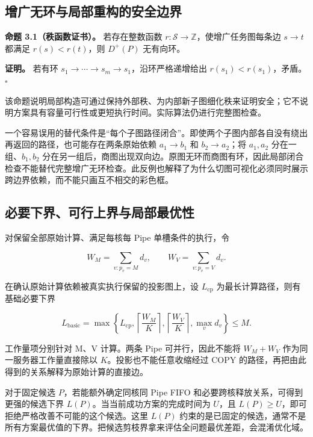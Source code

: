 \documentclass[anonymous,notoc]{gmcm2026}
\begin{document}
\subsection{增广无环与局部重构的安全边界}\label{ux589eux5e7fux65e0ux73afux4e0eux5c40ux90e8ux91cdux6784ux7684ux5b89ux5168ux8fb9ux754c}

\textbf{命题 3.1（秩函数证书）。} 若存在整数函数 \(r:\mathcal S\to\mathbb Z\)，使增广任务图每条边 \(s\to t\) 都满足 \(r(s)<r(t)\)，则 \(D^+(P)\) 无有向环。

\textbf{证明。} 若有环 \(s_1\to\cdots\to s_m\to s_1\)，沿环严格递增给出 \(r(s_1)<r(s_1)\)，矛盾。\(\square\)

该命题说明局部构造可通过保持外部秩、为内部新子图细化秩来证明安全；它不说明方案具有容量可行性或更短执行时间。实际算法仍进行完整图检查。

一个容易误用的替代条件是``每个子图路径闭合''。即使两个子图内部各自没有绕出再返回的路径，也可能存在两条原始依赖 \(a_1\to b_1\) 和 \(b_2\to a_2\)；将 \(a_1,a_2\) 分在一组、\(b_1,b_2\) 分在另一组后，商图出现双向边。原图无环而商图有环，因此局部闭合检查不能替代完整增广无环检查。此反例也解释了为什么切图可视化必须同时展示跨边界依赖，而不能只画互不相交的彩色框。

\subsection{必要下界、可行上界与局部最优性}\label{ux5fc5ux8981ux4e0bux754cux53efux884cux4e0aux754cux4e0eux5c40ux90e8ux6700ux4f18ux6027}

对保留全部原始计算、满足每核每 Pipe 单槽条件的执行，令

\[W_M=\sum_{v:p_v=M}d_v,\qquad W_V=\sum_{v:p_v=V}d_v.\]

在确认原始计算依赖被真实执行保留的投影图上，设 \(L_{\mathrm{cp}}\) 为最长计算路径，则有基础必要下界

\[L_{\mathrm{basic}}=\max\left\{L_{\mathrm{cp}},\left\lceil\frac{W_M}{K}\right\rceil,\left\lceil\frac{W_V}{K}\right\rceil,\max_vd_v\right\}\le M.\]

工作量项分别针对 M、V 计算。两条 Pipe 可并行，因此不能将 \(W_M+W_V\) 作为同一服务器工作量直接除以 \(K\)。投影也不能任意收缩经过 COPY 的路径，再把由此得到的关系解释为原始计算的直接边。

对于固定候选 \(P\)，若能额外确定同核同 Pipe FIFO 和必要跨核释放关系，可得到更强的候选下界 \(L(P)\)。当当前成功方案的完成时间为 \(U\)，且 \(L(P)\ge U\)，即可拒绝严格改善不可能的这个候选。这里 \(L(P)\) 约束的是已固定的候选，通常不是所有方案最优值的下界。把候选剪枝界拿来评估全问题最优差距，会混淆优化域。
\end{document}
